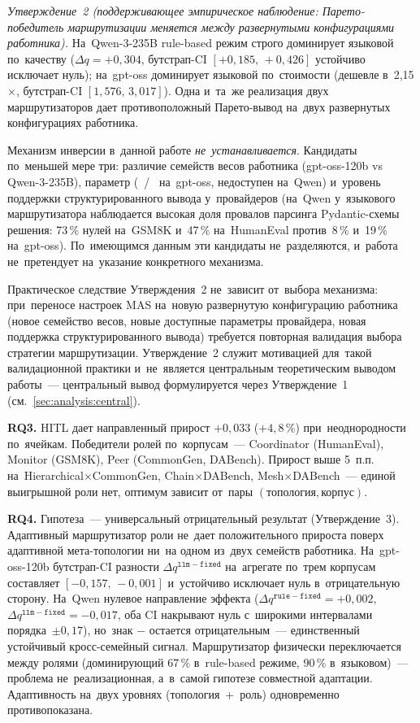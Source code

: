 \emph{Утверждение~2 (поддерживающее эмпирическое наблюдение:
Парето-победитель маршрутизации меняется между развернутыми
конфигурациями работника).} На~Qwen-3-235B rule-based режим
строго доминирует языковой по~качеству ($\Delta q=+0{,}304$,
бутстрап-CI $[+0{,}185,\,+0{,}426]$ устойчиво исключает нуль);
на~gpt-oss доминирует языковой по~стоимости (дешевле в~2{,}15$\times$,
бутстрап-CI $[1{,}576,\,3{,}017]$). Одна и~та~же реализация двух
маршрутизаторов дает противоположный Парето-вывод на~двух развернутых
конфигурациях работника.

Механизм инверсии в~данной работе \emph{не~устанавливается}.
Кандидаты по~меньшей мере три: различие семейств весов работника
(gpt-oss-120b vs Qwen-3-235B), параметр 
(~/~ на~gpt-oss, недоступен на~Qwen) и~уровень
поддержки структурированного вывода у~провайдеров (на~Qwen
у~языкового маршрутизатора наблюдается высокая доля провалов
парсинга Pydantic-схемы решения: 73\,\% нулей на~GSM8K
и~47\,\% на~HumanEval против~8\,\% и~19\,\% на~gpt-oss). По~имеющимся
данным эти кандидаты не~разделяются, и~работа не~претендует
на~указание конкретного механизма.

Практическое следствие Утверждения~2 не~зависит от~выбора механизма:
при~переносе настроек MAS на~новую развернутую конфигурацию
работника (новое семейство весов, новые доступные параметры
провайдера, новая поддержка структурированного вывода) требуется
повторная валидация выбора стратегии маршрутизации. Утверждение~2
служит мотивацией для~такой валидационной практики и~не~является
центральным теоретическим выводом работы~--- центральный вывод
формулируется через Утверждение~1 (см.~\ref{sec:analysis:central}).

\textbf{RQ3.} HITL дает направленный прирост $+0{,}033$
($+4{,}8\,\%$) при~неоднородности по~ячейкам. Победители ролей
по~корпусам~--- Coordinator (HumanEval), Monitor (GSM8K), Peer
(CommonGen, DABench). Прирост выше 5~п.п. на~Hierarchical$\times$CommonGen,
Chain$\times$DABench, Mesh$\times$DABench~--- единой выигрышной роли
нет, оптимум зависит от~пары $(\text{топология},\text{корпус})$.

\textbf{RQ4.} Гипотеза~--- универсальный отрицательный результат (Утверждение~3).
Адаптивный маршрутизатор роли не~дает положительного прироста поверх
адаптивной мета-топологии ни~на одном из~двух семейств работника.
На~gpt-oss-120b бутстрап-CI разности $\Delta q^{\mathtt{llm}-\mathtt{fixed}}$
на~агрегате по~трем корпусам составляет $[-0{,}157,\,-0{,}001]$ и~устойчиво
исключает нуль в~отрицательную сторону. На~Qwen нулевое направление эффекта
($\Delta q^{\mathtt{rule}-\mathtt{fixed}}=+0{,}002$,
$\Delta q^{\mathtt{llm}-\mathtt{fixed}}=-0{,}017$, оба CI накрывают нуль
с~широкими интервалами порядка~$\pm0{,}17$), но~знак
${-}$ остается отрицательным~--- единственный
устойчивый кросс-семейный сигнал. Маршрутизатор физически переключается
между ролями (доминирующий  67\,\% в~rule-based режиме,
 90\,\% в~языковом)~--- проблема не~реализационная,
а~в~самой гипотезе совместной адаптации. Адаптивность на~двух уровнях
(топология~+~роль) одновременно противопоказана.

